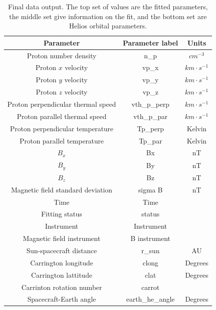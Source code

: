 \documentclass[11pt,a4paper]{article}
\begin{document}
\begin{table}[h]
	\centering
	\begin{tabular}{| c | c | c |}
		\hline
		Parameter 					& Parameter label	& Units 				\\ \hline \hline \hline
		Proton number density 			& n\_p			& $cm^{-3}$			\\ \hline
		Proton $x$ velocity		 		& vp\_x			& $km\cdot s^{-1}$	\\ \hline
		Proton $y$ velocity		 		& vp\_y			& $km\cdot s^{-1}$	\\ \hline
		Proton $z$ velocity		 		& vp\_z			& $km\cdot s^{-1}$	\\ \hline
		Proton perpendicular thermal speed 	& vth\_p\_perp		& $km\cdot s^{-1}$	\\ \hline
		Proton parallel thermal speed 		& vth\_p\_par		& $km\cdot s^{-1}$	\\ \hline
		Proton perpendicular temperature	& Tp\_perp		& Kelvin				\\ \hline
		Proton parallel temperature	 	& Tp\_par			& Kelvin				\\ \hline \hline
		$B_{x}$						& Bx				& nT					\\ \hline
		$B_{y}$						& By				& nT					\\ \hline
		$B_{z}$						& Bz				& nT					\\ \hline
		Magnetic field standard deviation	& sigma B			& nT					\\ \hline \hline
		Time						 	& Time			& 					\\ \hline
		Fitting status					& status			& 					\\ \hline
		Instrument		 			& Instrument		& 					\\ \hline
		Magnetic field instrument			& B instrument		&				\\ \hline \hline
		Sun-spacecraft distance			& r\_sun			& AU				\\ \hline
		Carrington longitude				& clong			& Degrees			\\ \hline
		Carrington lattitude				& clat			& Degrees			\\ \hline
		Carrinton rotation number			& carrot			&					\\ \hline
		Spacecraft-Earth angle			& earth\_he\_angle	& Degrees			\\ \hline

	\end{tabular}
	\caption{Final data output. The top set of values are the fitted parameters, the middle set give information on the fit, and the bottom set are Helios orbital parameters.}
	\label{tab:3D dict}
\end{table}
\end{document}
